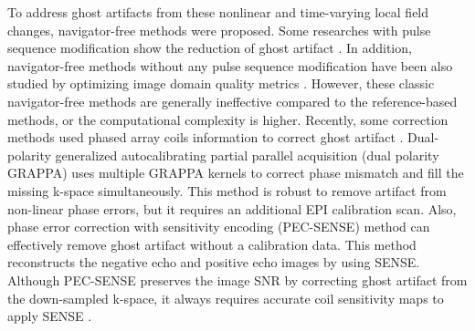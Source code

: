 \documentclass[num-refs]{wiley-article}
\newcommand{\0}{{\boldsymbol{0}}}
\newcommand{\1}{\blmath{1}}
\begin{document}
	To address ghost artifacts from these nonlinear and  time-varying local field changes, navigator-free methods were proposed. Some researches with pulse sequence modification show the reduction of ghost artifact \cite{xiang2007correction,kellman2006phased,Buonocore2001image,chen2004removal,hoge2010robust,yang1996double,poser2013single}. In addition,  navigator-free methods without any pulse sequence modification have been also studied by optimizing image domain quality metrics \cite{Buonocore2001image,zhang2004reference,skare2006afast,peterson2015acquisition}. However, these classic navigator-free methods are generally ineffective compared to the reference-based methods,  or the computational complexity is higher. Recently, some correction methods used phased array coils information to correct ghost artifact \cite{Hoge2016dual,xie2018robust,Ianni2018Ghost}.  Dual-polarity generalized autocalibrating partial parallel acquisition (dual polarity GRAPPA)\cite{Hoge2016dual} uses multiple GRAPPA kernels to correct phase mismatch and fill the missing k-space simultaneously. This method is robust to remove artifact from non-linear phase errors, but it requires an additional EPI calibration scan. Also, phase error correction with sensitivity encoding (PEC-SENSE)\cite{xie2018robust} method can effectively remove ghost artifact without a calibration data. This method reconstructs the negative echo and positive echo images by using SENSE. Although PEC-SENSE preserves the image SNR by  correcting ghost artifact from the down-sampled k-space, it always requires accurate coil sensitivity maps to apply SENSE \cite{xie2018robust}.
	
\end{document}
